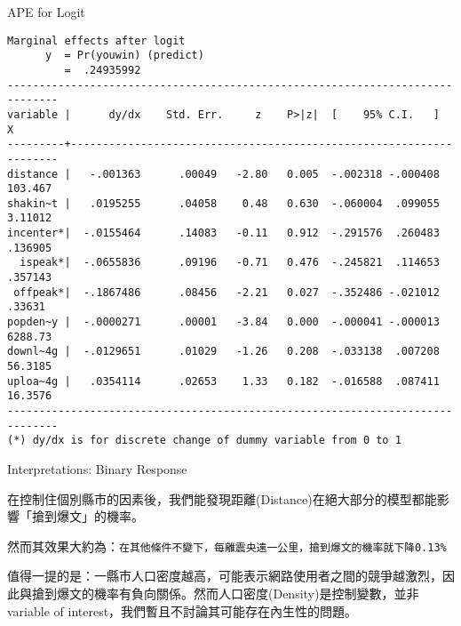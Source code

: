\begin{frame}[fragile]{APE for Logit}


\lstset{basicstyle=\tiny,style=myCustomMatlabStyle}

\begin{lstlisting}
Marginal effects after logit
      y  = Pr(youwin) (predict)
         =  .24935992
------------------------------------------------------------------------------
variable |      dy/dx    Std. Err.     z    P>|z|  [    95% C.I.   ]      X
---------+--------------------------------------------------------------------
distance |   -.001363      .00049   -2.80   0.005  -.002318 -.000408   103.467
shakin~t |   .0195255      .04058    0.48   0.630  -.060004  .099055   3.11012
incenter*|  -.0155464      .14083   -0.11   0.912  -.291576  .260483   .136905
  ispeak*|  -.0655836      .09196   -0.71   0.476  -.245821  .114653   .357143
 offpeak*|  -.1867486      .08456   -2.21   0.027  -.352486 -.021012    .33631
popden~y |  -.0000271      .00001   -3.84   0.000  -.000041 -.000013   6288.73
downl~4g |  -.0129651      .01029   -1.26   0.208  -.033138  .007208   56.3185
uploa~4g |   .0354114      .02653    1.33   0.182  -.016588  .087411   16.3576
------------------------------------------------------------------------------
(*) dy/dx is for discrete change of dummy variable from 0 to 1

\end{lstlisting}
\end{frame}

\begin{frame}[fragile]{Interpretations: Binary Response}

在控制住個別縣市的因素後，我們能發現距離(Distance)在絕大部分的模型都能影響「搶到爆文」的機率。

然而其效果大約為：\texttt{在其他條件不變下，每離震央遠一公里，搶到爆文的機率就下降0.13\%}

值得一提的是：一縣市人口密度越高，可能表示網路使用者之間的競爭越激烈，因此與搶到爆文的機率有負向關係。然而人口密度(Density)是控制變數，並非variable of interest，我們暫且不討論其可能存在內生性的問題。

\end{frame}


